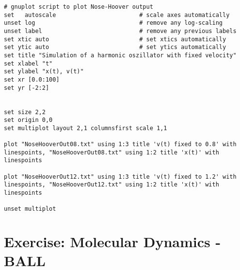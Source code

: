 \documentclass[11pt]{article}
\begin{document}
\begin{lstlisting}
# gnuplot script to plot Nose-Hoover output
set   autoscale                        # scale axes automatically
unset log                              # remove any log-scaling
unset label                            # remove any previous labels
set xtic auto                          # set xtics automatically
set ytic auto                          # set ytics automatically
set title "Simulation of a harmonic oszillator with fixed velocity"
set xlabel "t"
set ylabel "x(t), v(t)"
set xr [0.0:100]
set yr [-2:2]


set size 2,2
set origin 0,0
set multiplot layout 2,1 columnsfirst scale 1,1

plot "NoseHooverOut08.txt" using 1:3 title 'v(t) fixed to 0.8' with linespoints, "NoseHooverOut08.txt" using 1:2 title 'x(t)' with linespoints

plot "NoseHooverOut12.txt" using 1:3 title 'v(t) fixed to 1.2' with linespoints, "NoseHooverOut12.txt" using 1:2 title 'x(t)' with linespoints

unset multiplot	
\end{lstlisting}

\newpage
\section{Exercise: Molecular Dynamics - BALL}
\end{document}
